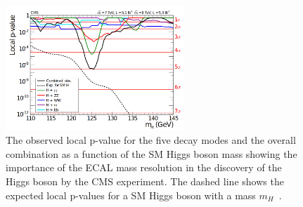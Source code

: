\begin{figure}
\centering
\includegraphics[width=0.6\textwidth]{figures/lhc_and_cms/higgs_observation_cms.png}
\caption{The observed local p-value for the five decay modes and the overall combination as a function of the SM Higgs boson mass showing the importance of the ECAL mass resolution in the discovery of the Higgs boson by the CMS experiment. The dashed line shows the expected local p-values for a SM Higgs boson with a mass $m_{H}$~\cite{cms_higgs}.}
\label{higgs_observation_cms}
\end{figure}